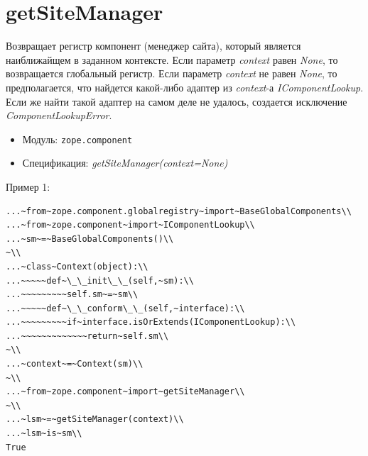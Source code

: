 \documentclass[a4paper,openany,twoside,draft]{book}
\providecommand*{\DUroletitlereference}[1]{\textsl{#1}}
\begin{document}
\section*{getSiteManager%
  \label{getsitemanager}%
}

Возвращает регистр компонент (менеджер сайта), который является
наиближайщем в заданном контексте. Если параметр \DUroletitlereference{context} равен
\DUroletitlereference{None}, то возвращается глобальный регистр.  Если параметр
\DUroletitlereference{context} не равен \DUroletitlereference{None}, то предполагается, что найдется какой-либо
адаптер из \DUroletitlereference{context}-а \DUroletitlereference{IComponentLookup}.  Если же найти такой
адаптер на самом деле не удалось, создается исключение
\DUroletitlereference{ComponentLookupError}.

\begin{itemize}

\item Модуль: \texttt{zope.component}

\item Спецификация: \DUroletitlereference{getSiteManager(context=None)}

\end{itemize}

Пример 1:

\begin{verbatim}
...~from~zope.component.globalregistry~import~BaseGlobalComponents\\
...~from~zope.component~import~IComponentLookup\\
...~sm~=~BaseGlobalComponents()\\
~\\
...~class~Context(object):\\
...~~~~~def~\_\_init\_\_(self,~sm):\\
...~~~~~~~~~self.sm~=~sm\\
...~~~~~def~\_\_conform\_\_(self,~interface):\\
...~~~~~~~~~if~interface.isOrExtends(IComponentLookup):\\
...~~~~~~~~~~~~~return~self.sm\\
~\\
...~context~=~Context(sm)\\
~\\
...~from~zope.component~import~getSiteManager\\
~\\
...~lsm~=~getSiteManager(context)\\
...~lsm~is~sm\\
True
\end{verbatim}
\end{document}
